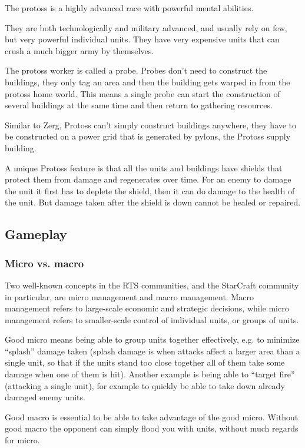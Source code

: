 The protoss is a highly advanced race with powerful mental abilities.

They are both technologically and military advanced, and usually rely on few, but very powerful individual units. They have very expensive units that can crush a much bigger army by themselves.

The protoss worker is called a probe. Probes don't need to construct the buildings, they only tag an area and then the building gets warped in from the protoss home world. This means a single probe can start the construction of several buildings at the same time and then return to gathering resources.

Similar to Zerg, Protoss can't simply construct buildings anywhere, they have to be constructed on a power grid that is generated by pylons, the Protoss supply building.

A unique Protoss feature is that all the units and buildings have shields that protect them from damage and regenerates over time. For an enemy to damage the unit it first has to deplete the shield, then it can do damage to the health of the unit. But damage taken after the shield is down cannot be healed or repaired.

\subsection{Gameplay}
\subsubsection{Micro vs. macro}
Two well-known concepts in the RTS communities, and the StarCraft community in particular, are micro management and macro management. Macro management refers to large-scale economic and strategic decisions, while micro management refers to smaller-scale control of individual units, or groups of units.

Good micro means being able to group units together effectively, e.g. to minimize ``splash'' damage taken (splash damage is when attacks affect a larger area than a single unit, so that if the units stand too close together all of them take some damage when one of them is hit). Another example is being able to ``target fire'' (attacking a single unit), for example to quickly be able to take down already damaged enemy units.

Good macro is essential to be able to take advantage of the good micro. Without good macro the opponent can simply flood you with units, without much regards for micro.

